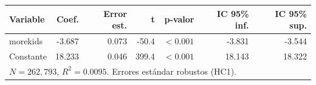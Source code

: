 
\begin{tabular}{lrrrrrr}
\toprule
Variable & Coef. & Error est. & t & p-valor & IC 95\% inf. & IC 95\% sup.\\
\midrule
morekids & -3.687 & 0.073 & -50.4 & $<0.001$ & -3.831 & -3.544\\
Constante & 18.233 & 0.046 & 399.4 & $<0.001$ & 18.143 & 18.322\\
\midrule
\multicolumn{7}{l}{$N=262{,}793$, $R^2=0.0095$. Errores estándar robustos (HC1).}\\
\bottomrule
\end{tabular}
